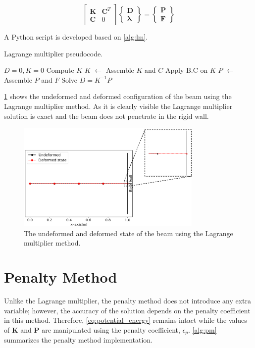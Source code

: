 \documentclass{article}
\begin{document}
\begin{equation*}
    \begin{bmatrix}
\mathbf{K} & \mathbf{C}^{T} \\ 
\mathbf{C} & 0
\end{bmatrix}
\begin{Bmatrix}
\mathbf{D}\\ 
\mathbf{\lambda}
\end{Bmatrix} = 
\begin{Bmatrix}
\mathbf{P}\\ 
\mathbf{F}
\end{Bmatrix}
\end{equation*}

A Python script is developed based on \cref{alg:lm}. 

\begin{algorithm}[H]
\caption{Lagrange multiplier pseudocode.}
\begin{algorithmic} 
\ENSURE $D = 0, K = 0$
\STATE Compute $K$
\STATE $K$ $\leftarrow$ Assemble $K$ and $C$
\STATE Apply B.C on $K$
\STATE $P$ $\leftarrow$ Assemble $P$ and $F$
\STATE Solve $D = K^{-1} P$
\end{algorithmic}
\label{alg:lm}
\end{algorithm}

\cref{fig:lm} shows the undeformed and deformed configuration of the beam using the Lagrange multiplier method. As it is clearly visible the Lagrange multiplier solution is exact and the beam does not penetrate in the rigid wall. 

\begin{figure}[H]
    \centering
    \includegraphics[width = 0.8\textwidth ]{figures/lm.png}
    \caption{The undeformed and deformed state of the beam using the Lagrange multiplier method.}
    \label{fig:lm}
\end{figure}

\section{Penalty Method}
Unlike the Lagrange multiplier, the penalty method does not introduce any extra variable; however, the accuracy of the solution depends on the penalty coefficient in this method. Therefore, \cref{eq:potential_energy} remains intact while the values of $\mathbf{K}$ and $\mathbf{P}$ are manipulated using the penalty coefficient, $\epsilon_p$. \cref{alg:pm} summarizes the penalty method implementation.
\end{document}
